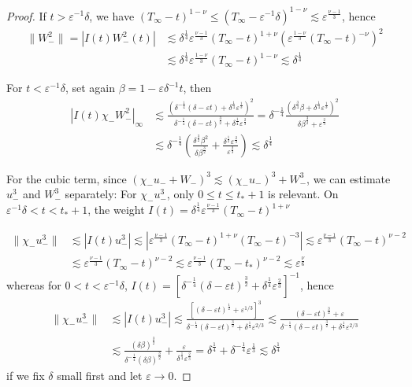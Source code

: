 \documentclass[letterpaper,11pt]{article}
\newcommand{\eps}{\varepsilon}
\newcommand{\lar}{ \lesssim }
\numberwithin{equation}{section}
\theoremstyle{plain}
\begin{document}
\begin{enumerate}
\begin{itemize}
\begin{enumerate}
\begin{proof}
If $t > \eps^{-1}\delta$, we have $(T_\infty -t )^{1-\nu} \le (T_\infty - \eps^{-1}\delta)^{1-\nu} \lar \eps^{\frac{\nu-1}{3}}$, hence 
\begin{align*}
\|W_-^2\| = |I(t) W_-^2(t) | &\lar \delta^{\frac{1}{4}} \eps^{\frac{\nu-1}{3}}(T_\infty - t)^{1+\nu}\left( \eps^{\frac{1-\nu}{3}}(T_\infty - t)^{-\nu}\right)^2\\ & \lar \delta^{\frac{1}{4}} \eps^{\frac{1-\nu}{3}}(T_\infty-t)^{1-\nu} \lar \delta^{\frac{1}{4}}
\end{align*} 

For $t < \eps^{-1}\delta$, set again $\beta = 1-\eps \delta^{-1}t$, then
\begin{align*}
|I(t)\chi_-  W_-^2|_\infty &\lar \frac{ \left( \delta^{-\frac{1}{4}}(\delta-\eps t)+\delta^{\frac{1}{4}}\eps^{\frac{1}{3}} \right)^2}{\delta^{-\frac{1}{4}}(\delta-\eps t)^{\frac{3}{2}}+\delta^{\frac{1}{4}}\eps^{\frac{2}{3}} } = \delta^{-\frac{1}{4}}\frac{\left( \delta^{\frac{3}{4}}\beta+\delta^{\frac{1}{4}}\eps^{\frac{1}{3}} \right)^2 }{\delta\beta^{\frac{3}{2}}+\eps^{\frac{2}{3}}} \\
& \lar \delta^{-\frac{1}{4}} \left(\frac{\delta^{\frac{3}{2}}\beta^2}{\delta\beta^{\frac{3}{2}}} + \frac{\delta^{\frac{1}{2}}\eps^{\frac{2}{3}}}{\eps^{\frac{2}{3}}} \right) \lar \delta^{\frac{1}{4}}
\end{align*}



For the cubic term, since $(\chi_-u_-+W_-)^3 \lar (\chi_-u_-)^3+W_-^3$, we can estimate $u_-^3$ and $W_-^3$ separately:
For $\chi_-u_-^3$, only $0 \le t \le t_*+1$ is relevant. On $\eps^{-1}\delta<t<t_*+1$, the weight $I(t) = \delta^{\frac{1}{4}}\eps^{\frac{\nu-1}{3}}(T_\infty-t)^{1+\nu}$


\begin{align*}
\|\chi_-u_-^3\| &\lar | I(t)u_-^3| \lar |\eps^{\frac{\nu-1}{3}}(T_\infty-t)^{1+\nu}(T_\infty-t)^{-3} | \lar \eps^{\frac{\nu-1}{3}} (T_\infty-t)^{\nu-2} \\
& \lar \eps^{\frac{\nu-1}{3}}  (T_\infty - t)^{\nu-2} \lar \eps^{\frac{\nu-1}{3}} (T_\infty-t_*)^{\nu-2} \lar \eps^{\frac{\nu}{6}}
\end{align*}
whereas for $0<t<\eps^{-1}\delta$, $I(t) =  [\delta^{-\frac{1}{4}} (\delta -\eps t)^{\frac{3}{2}}+\delta^{\frac{1}{4}}\eps^{\frac{2}{3}}]^{-1}$, hence
\begin{align*}
\| \chi_-u_-^3\| &\lar |I(t)u_-^3| \lar \frac{[(\delta-\eps t)^{\frac{1}{2}}+\eps^{1/3} ]^{3}}{ \delta^{-\frac{1}{4}}(\delta-\eps t)^{\frac{3}{2}} + \delta^{\frac{1}{4}}\eps^{2/3}} \lar \frac{ (\delta-\eps t)^{\frac{3}{2}}+ \eps}{\delta^{-\frac{1}{4}}(\delta-\eps t)^{\frac{3}{2}} + \delta^{\frac{1}{4}}\eps^{2/3}}\\
&\lar \frac{(\delta\beta)^{\frac{3}{2}}}{\delta^{-\frac{1}{4}}(\delta\beta)^{\frac{3}{2}} } + \frac{\eps}{\delta^{\frac{1}{4}} \eps^{\frac{2}{3}}}  = \delta^{\frac{1}{4}} + \delta^{-\frac{1}{4}}\eps^{\frac{1}{3}} \lar \delta^{\frac{1}{4}}
\end{align*}
if we fix $\delta$ small first and let $\eps \to 0$.


\end{proof}
\end{enumerate}
\end{itemize}
\end{enumerate}
\end{document}
